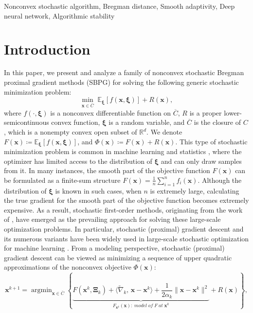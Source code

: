 \documentclass[twoside,11pt]{article}
\newcommand{\R}{\mathbb R}
\newcommand{\E}{\mathbb{E}}
\DeclareMathOperator*{\argmin}{argmin}
\def\inprod#1#2{\langle#1,\,#2\rangle}
\def\vx{{\bm{x}}}
\begin{document}
\begin{keywords}
 Nonconvex stochastic algorithm, Bregman distance, Smooth adaptivity, Deep neural network, Algorithmic stability
\end{keywords}

\section{Introduction}\label{sec-introduction}
In this paper, we present and analyze a family of nonconvex stochastic Bregman proximal gradient methods (SBPG) for solving the following generic stochastic minimization problem:
\begin{equation}
\min_{\vx\in \overline{C}}\;\E_{{\bm\xi}}[f(\vx,{\bm\xi})]+R(\vx),
\label{min-prob}
\end{equation}
where $f(\cdot,{\bm\xi})$ is a nonconvex differentiable function on $\overline{C}$, $R$ is a proper lower-semicontinuous convex function, ${\bm\xi}$ is a random variable, and $\overline{C}$ is the closure of $C$, which is a nonempty convex open subset of $\R^d$. We denote $F(\vx)\coloneqq\E_{{\bm\xi}}[f(\vx,{\bm\xi})]$, and $\Phi(\vx)\coloneqq F(\vx)+R(\vx)$. This type of stochastic minimization problem is common in machine learning and statistics \citep{hastie2009elements, shapiro2021lectures, zhang2004solving}, where the optimizer has limited access to the distribution of $\bm\xi$ and can only draw samples from it. In many instances, the smooth part of the objective function $F(\vx)$ can be formulated as a finite-sum structure $F(\vx)=\frac{1}{n}\sum_{i=1}^nf_i(\vx)$. Although the distribution of $\bm\xi$ is known in such cases, when $n$ is extremely large, calculating the true gradient for the smooth part of the objective function becomes extremely expensive. As a result, stochastic first-order methods, originating from the work of \citet{robbins1951stochastic}, have emerged as the prevailing approach for solving these large-scale optimization problems. In particular, stochastic (proximal) gradient descent and its numerous variants \citep{duchi2011adaptive,duchi2009efficient,gu2020unified,kingma2014adam,JMLR:v18:16-410,wang2022riemannian} have been widely used in large-scale stochastic optimization for machine learning \citep{lecun2015deep,shapiro2021lectures,zhang2004solving}. From a modeling perspective, stochastic (proximal) gradient descent can be viewed as minimizing a sequence of upper quadratic approximations of the nonconvex objective $\Phi(\vx)$:
\begin{equation}
{\vx^{k+1}}=\argmin_{\vx\in \overline{C}}\left\{\underbrace{F({\vx^k},{\bm\Xi}_{k})+\inprod{\widetilde\nabla_k}{\vx-{\vx^k}}+\frac{1}{2\alpha_k}\|\vx-{\vx^k}\|^2}_{F_{{\vx^k}}(\vx):\;model\;of\;F\;at\;{\vx^k}}+R(\vx)\right\},
\label{convention-model} 
\end{equation}
\end{document}
